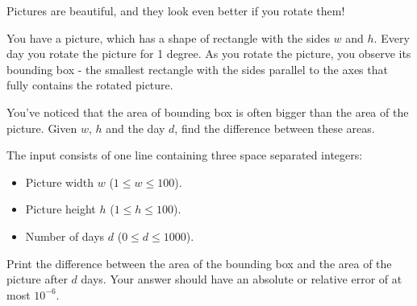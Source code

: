 \problemname{\problemyamlname}


\newcommand{\mina}{1}
\newcommand{\maxa}{100}
\newcommand{\minn}{0}
\newcommand{\maxn}{1000}

Pictures are beautiful, and they look even better if you rotate them!

You have a picture, which has a shape of rectangle with the sides $w$ and $h$. Every day you rotate the picture for 1 degree. As you rotate the picture, you observe its bounding box - the smallest rectangle with the sides parallel to the axes that fully contains the rotated picture. 

You've noticed that the area of bounding box is often bigger than the area of the picture. Given $w$, $h$ and the day $d$, find the difference between these areas.

\begin{Input}
    The input consists of one line containing three space separated integers:
    \begin{itemize}
        \item Picture width $w$ ($\mina \leq w\leq \maxa$).
        \item Picture height $h$ ($\mina \leq h\leq \maxa$).
        \item Number of days $d$ ($\minn \leq d\leq \maxn$).
    \end{itemize}
\end{Input}

\begin{Output}
    Print the difference between the area of the bounding box and the area of the picture after $d$ days.
    Your answer should have an absolute or relative error of at most $10^{-6}$.
\end{Output}
